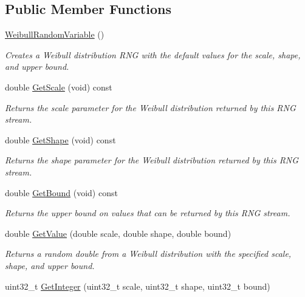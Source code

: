 \subsection*{Public Member Functions}
\begin{DoxyCompactItemize}
\item 
\hyperlink{classns3_1_1WeibullRandomVariable_a9d3b8bdd7b1ae5f09a9a06285d67df52}{Weibull\+Random\+Variable} ()
\begin{DoxyCompactList}\small\item\em Creates a Weibull distribution R\+NG with the default values for the scale, shape, and upper bound. \end{DoxyCompactList}\item 
double \hyperlink{classns3_1_1WeibullRandomVariable_a61c82717ad8c06c8f098ab88f37a6c54}{Get\+Scale} (void) const 
\begin{DoxyCompactList}\small\item\em Returns the scale parameter for the Weibull distribution returned by this R\+NG stream. \end{DoxyCompactList}\item 
double \hyperlink{classns3_1_1WeibullRandomVariable_a3e71221cc1305f8d01b3057317be2ff8}{Get\+Shape} (void) const 
\begin{DoxyCompactList}\small\item\em Returns the shape parameter for the Weibull distribution returned by this R\+NG stream. \end{DoxyCompactList}\item 
double \hyperlink{classns3_1_1WeibullRandomVariable_a1920053804effdc2c378c47aecc56bbc}{Get\+Bound} (void) const 
\begin{DoxyCompactList}\small\item\em Returns the upper bound on values that can be returned by this R\+NG stream. \end{DoxyCompactList}\item 
double \hyperlink{classns3_1_1WeibullRandomVariable_af64818134b6b7734f33a81bca8d15023}{Get\+Value} (double scale, double shape, double bound)
\begin{DoxyCompactList}\small\item\em Returns a random double from a Weibull distribution with the specified scale, shape, and upper bound. \end{DoxyCompactList}\item 
uint32\+\_\+t \hyperlink{classns3_1_1WeibullRandomVariable_aec7fac5766cf96f4a089b4dcae9a39fc}{Get\+Integer} (uint32\+\_\+t scale, uint32\+\_\+t shape, uint32\+\_\+t bound)

\end{DoxyCompactItemize}
